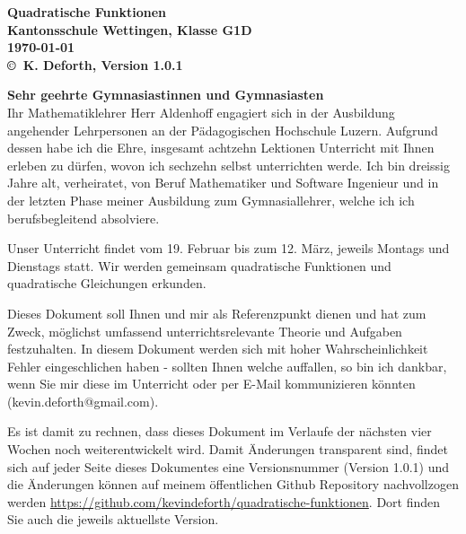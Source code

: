 \documentclass[12pt]{article}
\newcommand{\docName}{Quadratische Funktionen}
\newcommand{\docVersion}{Version 1.0.1}
\newcommand{\klasse}{Kantonsschule Wettingen, Klasse G1D}
\begin{document}
\begingroup %
\centering %
\LARGE\bfseries %
\docName{} \\[1em] %
\normalsize
\klasse \\[0.5em]
\today\\[0.5em]
\mdseries\normalsize
\copyright~K. Deforth, \docVersion{}\\[2em] %
\endgroup

\thispagestyle{empty}

\noindent%
\textbf{Sehr geehrte Gymnasiastinnen und Gymnasiasten}\\

Ihr Mathematiklehrer Herr Aldenhoff engagiert sich in der Ausbildung angehender Lehrpersonen an der Pädagogischen Hochschule Luzern. Aufgrund dessen habe ich die Ehre, insgesamt achtzehn Lektionen Unterricht mit Ihnen erleben zu dürfen, wovon ich sechzehn selbst unterrichten werde. Ich bin dreissig Jahre alt, verheiratet, von Beruf Mathematiker und Software Ingenieur und in der letzten Phase meiner Ausbildung zum Gymnasiallehrer, welche ich ich berufsbegleitend absolviere.

Unser Unterricht findet vom 19. Februar bis zum 12. März, jeweils Montags und Dienstags statt. Wir werden gemeinsam quadratische Funktionen und quadratische Gleichungen erkunden.

Dieses Dokument soll Ihnen und mir als Referenzpunkt dienen und hat zum Zweck, möglichst umfassend unterrichtsrelevante Theorie und Aufgaben festzuhalten. In diesem Dokument werden sich mit hoher Wahrscheinlichkeit Fehler eingeschlichen haben - sollten Ihnen welche auffallen, so bin ich dankbar, wenn Sie mir diese im Unterricht oder per E-Mail kommunizieren könnten ({kevin.deforth@gmail.com}). 

Es ist damit zu rechnen, dass dieses Dokument im Verlaufe der nächsten vier Wochen noch weiterentwickelt wird. Damit Änderungen transparent sind, findet sich auf jeder Seite dieses Dokumentes eine Versionsnummer (\docVersion) und die Änderungen können auf meinem öffentlichen Github Repository nachvollzogen werden \href{https://github.com/kevindeforth/quadratische-funktionen}{https://github.com/kevindeforth/quadratische-funktionen}. Dort finden Sie auch die jeweils aktuellste Version.
\end{document}

